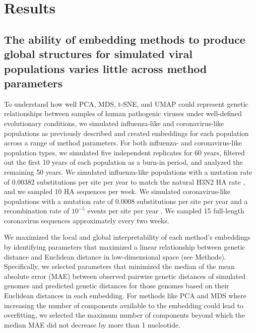 \documentclass[webpdf,contemporary,large,single]{oup-authoring-template}%
\theoremstyle{thmstyleone}%
\theoremstyle{thmstyletwo}%
\theoremstyle{thmstylethree}%
\begin{document}
\section{Results}

\subsection{The ability of embedding methods to produce global structures for simulated viral populations varies little across method parameters}

To understand how well PCA, MDS, t-SNE, and UMAP could represent genetic relationships between samples of human pathogenic viruses under well-defined evolutionary conditions, we simulated influenza-like and coronavirus-like populations as previously described \citep{Huddleston2020,Muller2022} and created embeddings for each population across a range of method parameters.
For both influenza- and coronavirus-like population types, we simulated five independent replicates for 60 years, filtered out the first 10 years of each population as a burn-in period, and analyzed the remaining 50 years.
We simulated influenza-like populations with a mutation rate of 0.00382 substitutions per site per year to match the natural H3N2 HA rate \citep{Huddleston2020}, and we sampled 10 HA sequences per week.
We simulated coronavirus-like populations with a mutation rate of 0.0008 substitutions per site per year \citep{Rambaut2020} and a recombination rate of $10^{-5}$ events per site per year \citep{Muller2022}.
We sampled 15 full-length coronavirus sequences approximately every two weeks.

We maximized the local and global interpretability of each method's embeddings by identifying parameters that maximized a linear relationship between genetic distance and Euclidean distance in low-dimensional space (see Methods).
Specifically, we selected parameters that minimized the median of the mean absolute error (MAE) between observed pairwise genetic distances of simulated genomes and predicted genetic distances for those genomes based on their Euclidean distances in each embedding.
For methods like PCA and MDS where increasing the number of components available to the embedding could lead to overfitting, we selected the maximum number of components beyond which the median MAE did not decrease by more than 1 nucleotide.
\end{document}
